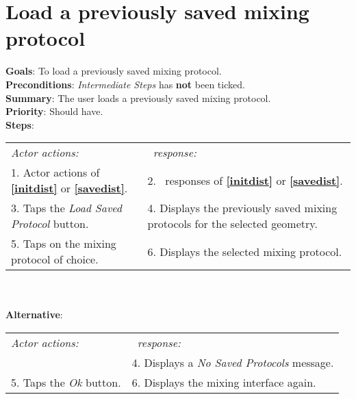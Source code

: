   \section{Load a previously saved mixing protocol}
  \label{loadsaveprot}
  \textbf{Goals}: To load a previously saved mixing protocol.\\
  \textbf{Preconditions}: \emph{Intermediate Steps} has \textbf{not} been ticked.\\
  \textbf{Summary}: The user loads a previously saved mixing protocol.\\
  \textbf{Priority}: Should have.\\
  \textbf{Steps}: \\
  \begin{tabular}{ p{} p{} }
  	\emph{Actor actions:} & \emph{\projectname\ response:} \\
  	1. Actor actions of \textbf{\ref{initdist}} or  \textbf{\ref{savedist}}. & 2. \projectname\ responses of \textbf{\ref{initdist}} or  \textbf{\ref{savedist}}. \\
	3. Taps the \emph{Load Saved Protocol} button. & 4. Displays the previously saved mixing protocols for the selected geometry. \\
	5. Taps on the mixing protocol of choice. & 6. Displays the selected mixing protocol.\\
	\end{tabular}
	        \\
     \\\textbf{Alternative}: \\
    \begin{tabular}{ p{} p{} }
  	\emph{Actor actions:} & \emph{\projectname\ response:} \\
            & 4. Displays a \emph{No Saved Protocols} message. \\
    5. Taps the \emph{Ok} button. & 6. Displays the mixing interface again. \\
  \end{tabular}
  

